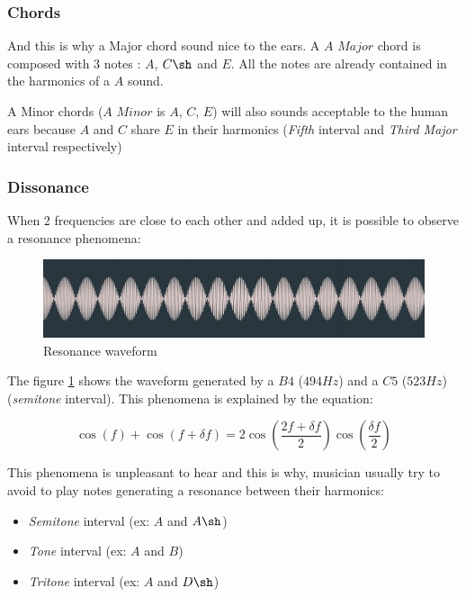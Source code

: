 \documentclass[12pt]{report}
\begin{document}
\subsubsection{Chords}

And this is why a Major chord sound nice to the ears. A $A$ $Major$ chord is composed with 3 notes : $A$, $C\sh$ and $E$. All the notes are already contained in the harmonics of a $A$ sound.

A Minor chords ($A$ $Minor$ is $A$, $C$, $E$) will also sounds acceptable to the human ears because $A$ and $C$ share $E$ in their harmonics (\textit{Fifth} interval and \textit{Third Major} interval respectively) 

\subsubsection{Dissonance}

When 2 frequencies are close to each other and added up, it is possible to observe a resonance phenomena:

\begin{figure}[H]
    \centering
    \includegraphics[width=\textwidth]{images/music/waveform/resonance.jpg}
    \caption{Resonance waveform}
    \label{fig:resonance}
\end{figure}
The figure \ref{fig:resonance} shows the waveform generated by a $B4$ ($494Hz$) and a $C5$ ($523Hz$) (\textit{semitone} interval).
This phenomena is explained by the equation:

\begin{equation}
    \cos(f) + \cos(f + \delta f) = 2 \cos(\frac{2f + \delta f}{2}) \cos(\frac{\delta f}{2})
\end{equation}

This phenomena is unpleasant to hear and this is why, musician usually try to avoid to play notes generating a resonance between their harmonics:
\begin{itemize}
    \item \textit{Semitone} interval (ex: $A$ and $A\sh$)
    \item \textit{Tone} interval (ex: $A$ and $B$)
    \item \textit{Tritone} interval (ex: $A$ and $D\sh$)
\end{itemize}
\end{document}
